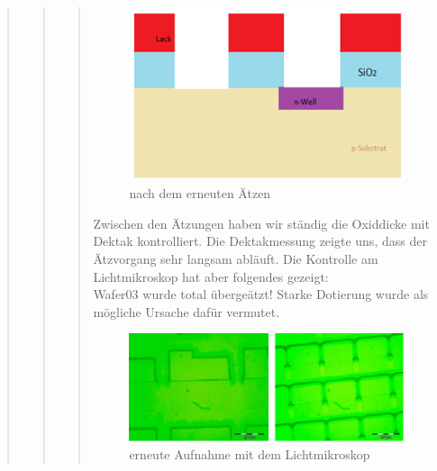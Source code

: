 \begin{quote}
\begin{quote}
\begin{quote}
			\vspace{2em}

    		\begin{figure}[H]
				\hspace{3 cm}
                  \includegraphics[scale=1, trim = 0cm 0cm 0cm 0cm,clip]
                	{./HerstellungBilder/StrukturnachdemAetzen2.png}
                  \caption{nach dem erneuten Ätzen}
                \label{fig:ernAetz}
            \end{figure}

    		\vspace{2em}
			
			Zwischen den Ätzungen haben wir ständig die Oxiddicke mit Dektak 
			kontrolliert. Die Dektakmessung zeigte uns, dass der Ätzvorgang sehr
			langsam abläuft. Die Kontrolle am Lichtmikroskop hat aber folgendes 
			gezeigt:\\
			Wafer03 wurde total übergeätzt! Starke Dotierung wurde als mögliche 
			Ursache dafür vermutet.
			
			\vspace{2em}

    		\begin{figure}[H]
				\hspace{-0.7 cm}
                  \includegraphics[scale=1, trim = 0cm 0cm 0cm 0cm,clip]
                	{./HerstellungBilder/LichtmikroskopbilderW23.png}
                  \caption{erneute Aufnahme mit dem Lichtmikroskop}
                \label{fig:ernLichtmi}
            \end{figure}
            

\end{quote}
\end{quote}
\end{quote}
